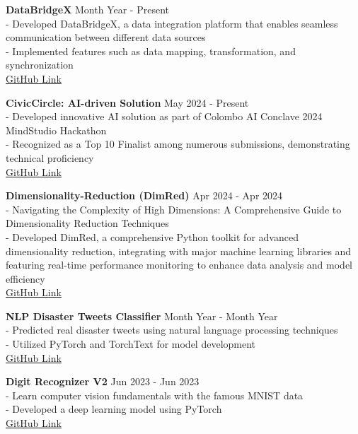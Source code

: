 \documentclass[10pt,letterpaper]{article}
\begin{document}
\textbf{DataBridgeX} \hfill Month Year - Present \\
- Developed DataBridgeX, a data integration platform that enables seamless communication between different data sources \\
- Implemented features such as data mapping, transformation, and synchronization \\
\href{https://github.com/Programmer-RD-AI/DataBridgeX}{GitHub Link}

\textbf{CivicCircle: AI-driven Solution} \hfill May 2024 - Present \\
- Developed innovative AI solution as part of Colombo AI Conclave 2024 MindStudio Hackathon \\
- Recognized as a Top 10 Finalist among numerous submissions, demonstrating technical proficiency \\
\href{https://github.com/Programmer-RD-AI/CivicCircle}{GitHub Link}

\textbf{Dimensionality-Reduction (DimRed)} \hfill Apr 2024 - Apr 2024 \\
- Navigating the Complexity of High Dimensions: A Comprehensive Guide to Dimensionality Reduction Techniques \\
- Developed DimRed, a comprehensive Python toolkit for advanced dimensionality reduction, integrating with major machine learning libraries and featuring real-time performance monitoring to enhance data analysis and model efficiency \\
\href{https://github.com/Programmer-RD-AI/DimRed}{GitHub Link}

\textbf{NLP Disaster Tweets Classifier} \hfill Month Year - Month Year \\
- Predicted real disaster tweets using natural language processing techniques \\
- Utilized PyTorch and TorchText for model development \\
\href{https://github.com/Programmer-RD-AI/NLP-Disaster-Tweets}{GitHub Link}

\textbf{Digit Recognizer V2} \hfill Jun 2023 - Jun 2023 \\
- Learn computer vision fundamentals with the famous MNIST data \\
- Developed a deep learning model using PyTorch \\
\href{https://github.com/Programmer-RD-AI/Digit-Recognizer-V2}{GitHub Link}
\end{document}
